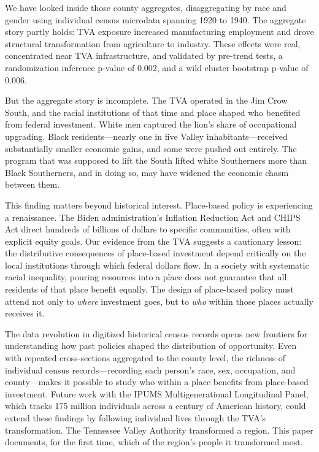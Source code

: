 \documentclass[12pt]{article}
\begin{document}
We have looked inside those county aggregates, disaggregating by race and gender using individual census microdata spanning 1920 to 1940. The aggregate story partly holds: TVA exposure increased manufacturing employment and drove structural transformation from agriculture to industry. These effects were real, concentrated near TVA infrastructure, and validated by pre-trend tests, a randomization inference p-value of 0.002, and a wild cluster bootstrap p-value of 0.006.

But the aggregate story is incomplete. The TVA operated in the Jim Crow South, and the racial institutions of that time and place shaped who benefited from federal investment. White men captured the lion's share of occupational upgrading. Black residents---nearly one in five Valley inhabitants---received substantially smaller economic gains, and some were pushed out entirely. The program that was supposed to lift the South lifted white Southerners more than Black Southerners, and in doing so, may have widened the economic chasm between them.

This finding matters beyond historical interest. Place-based policy is experiencing a renaissance. The Biden administration's Inflation Reduction Act and CHIPS Act direct hundreds of billions of dollars to specific communities, often with explicit equity goals. Our evidence from the TVA suggests a cautionary lesson: the distributive consequences of place-based investment depend critically on the local institutions through which federal dollars flow. In a society with systematic racial inequality, pouring resources into a place does not guarantee that all residents of that place benefit equally. The design of place-based policy must attend not only to \textit{where} investment goes, but to \textit{who} within those places actually receives it.

The data revolution in digitized historical census records opens new frontiers for understanding how past policies shaped the distribution of opportunity. Even with repeated cross-sections aggregated to the county level, the richness of individual census records---recording each person's race, sex, occupation, and county---makes it possible to study who within a place benefits from place-based investment. Future work with the IPUMS Multigenerational Longitudinal Panel, which tracks 175 million individuals across a century of American history, could extend these findings by following individual lives through the TVA's transformation. The Tennessee Valley Authority transformed a region. This paper documents, for the first time, which of the region's people it transformed most.
\end{document}
